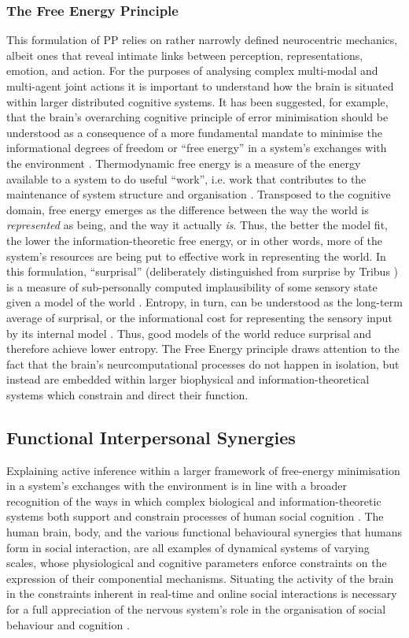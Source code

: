 \subsubsection{The Free Energy Principle}
This formulation of PP relies on rather narrowly defined neurocentric mechanics, albeit ones that reveal intimate links between perception, representations, emotion, and action.  For the purposes of analysing complex multi-modal and multi-agent joint actions it is important to understand how the brain is situated within larger distributed cognitive systems.  It has been suggested, for example, that the brain's overarching cognitive principle of error minimisation should be understood as a consequence of a more fundamental mandate to minimise the informational degrees of freedom or ``free energy'' in a system's exchanges with the environment \citep{Friston2010}.  Thermodynamic free energy is a measure of the energy available to a system to do useful ``work'', i.e. work that contributes to the maintenance of system structure and organisation \citep{Stoner2000}.
Transposed to the cognitive domain, free energy emerges as the difference between the way the world is \textit{represented} as being, and the way it actually \textit{is}.
Thus, the better the model fit, the lower the information-theoretic free energy, or in other words, more of the system's resources are being put to effective work in representing the world.  In this formulation, ``surprisal'' (deliberately distinguished from surprise by Tribus \textcite{Tribus1961}) is a measure of sub-personally computed implausibility of some sensory state given a model of the world \citep{Clark2013}.  Entropy, in turn, can be understood as the long-term average of surprisal, or the informational cost for representing the sensory input by its internal model \citep{Little2013}.  Thus, good models of the world reduce surprisal and therefore achieve lower entropy.  The Free Energy principle draws attention to the fact that the brain's neurcomputational processes do not happen in isolation, but instead are embedded within larger biophysical and information-theoretical systems which constrain and direct their function.

\subsection{Functional Interpersonal Synergies}
Explaining active inference within a larger framework of free-energy minimisation in a system's exchanges with the environment is in line with a broader recognition of the ways in which complex biological and information-theoretic systems both support and constrain processes of human social cognition \citep{Dale2014}.  The human brain, body, and the various functional behavioural synergies that humans form in social interaction, are all examples of dynamical systems of varying scales, whose physiological and cognitive parameters enforce constraints on the expression of their componential mechanisms.  Situating the activity of the brain in the constraints inherent in real-time and online social interactions is necessary for a full appreciation of the nervous system's role in the organisation of social behaviour and cognition \citep{Coey2012}.

